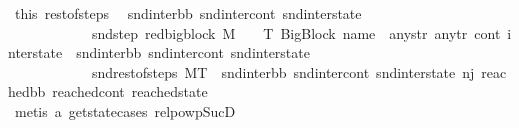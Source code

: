 \begin{isabellebody}
\ this\ rest{\isacharunderscore}{\kern0pt}of{\isacharunderscore}{\kern0pt}steps\ \isamarkupfalse%
\ snd{\isacharunderscore}{\kern0pt}inter{\isacharunderscore}{\kern0pt}bb\ snd{\isacharunderscore}{\kern0pt}inter{\isacharunderscore}{\kern0pt}cont\ snd{\isacharunderscore}{\kern0pt}inter{\isacharunderscore}{\kern0pt}state\ \isanewline
\ \ \ \ \ \ \ \ \ \ \ \ snd{\isacharunderscore}{\kern0pt}step{\isacharcolon}{\kern0pt}\ {\isachardoublequoteopen}red{\isacharunderscore}{\kern0pt}bigblock\ M\ {\isasymLambda}\ {\isasymGamma}\ {\isasymOmega}\ T\ {\isacharparenleft}{\kern0pt}{\isacharparenleft}{\kern0pt}BigBlock\ name\ {\isacharbrackleft}{\kern0pt}{\isacharbrackright}{\kern0pt}\ any{\isacharunderscore}{\kern0pt}str\ any{\isacharunderscore}{\kern0pt}tr{\isacharparenright}{\kern0pt}{\isacharcomma}{\kern0pt}\ cont{}{\isacharcomma}{\kern0pt}\ inter{\isacharunderscore}{\kern0pt}state{\isacharparenright}{\kern0pt}\ \ {\isacharparenleft}{\kern0pt}snd{\isacharunderscore}{\kern0pt}inter{\isacharunderscore}{\kern0pt}bb{\isacharcomma}{\kern0pt}\ snd{\isacharunderscore}{\kern0pt}inter{\isacharunderscore}{\kern0pt}cont{\isacharcomma}{\kern0pt}\ snd{\isacharunderscore}{\kern0pt}inter{\isacharunderscore}{\kern0pt}state{\isacharparenright}{\kern0pt}{\isachardoublequoteclose}\ \isanewline
\ \ \ \ \ \ \ \ \ \ \ \ snd{\isacharunderscore}{\kern0pt}rest{\isacharunderscore}{\kern0pt}of{\isacharunderscore}{\kern0pt}steps{\isacharcolon}{\kern0pt}\ {\isachardoublequoteopen}M{\isacharcomma}{\kern0pt}{\isasymLambda}{\isacharcomma}{\kern0pt}{\isasymGamma}{\isacharcomma}{\kern0pt}{\isasymOmega}{\isacharcomma}{\kern0pt}T\ {\isasymturnstile}\ {\isacharparenleft}{\kern0pt}snd{\isacharunderscore}{\kern0pt}inter{\isacharunderscore}{\kern0pt}bb{\isacharcomma}{\kern0pt}\ snd{\isacharunderscore}{\kern0pt}inter{\isacharunderscore}{\kern0pt}cont{\isacharcomma}{\kern0pt}\ snd{\isacharunderscore}{\kern0pt}inter{\isacharunderscore}{\kern0pt}state{\isacharparenright}{\kern0pt}\ {\isacharminus}{\kern0pt}n{\isasymlongrightarrow}{\isacharcircum}{\kern0pt}j{\isacharprime}{\kern0pt}{\isacharprime}{\kern0pt}\ {\isacharparenleft}{\kern0pt}reached{\isacharunderscore}{\kern0pt}bb{\isacharcomma}{\kern0pt}\ reached{\isacharunderscore}{\kern0pt}cont{\isacharcomma}{\kern0pt}\ reached{\isacharunderscore}{\kern0pt}state{\isacharparenright}{\kern0pt}{\isachardoublequoteclose}\isanewline
\ \ \ \ \ \ \ \ \ \ \ \ \isamarkupfalse%
\ {\isacharparenleft}{\kern0pt}metis\ a{}\ get{\isacharunderscore}{\kern0pt}state{\isachardot}{\kern0pt}cases\ relpowp{\isacharunderscore}{\kern0pt}Suc{\isacharunderscore}{\kern0pt}D{}{\isacharparenright}{\kern0pt}\isanewline

\end{isabellebody}
